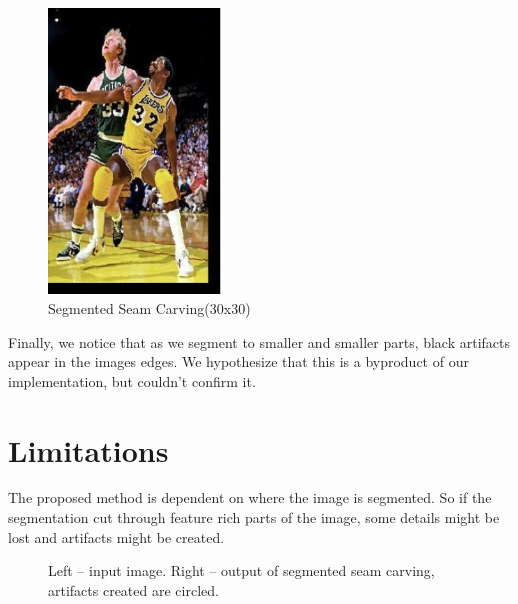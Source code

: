 \documentclass[conference]{acmsiggraph}
\begin{document}
\begin{figure}[ht]
  \centering
  \includegraphics[width=1.8in]{images/bird_32by32}
  \caption{ Segmented Seam Carving(30x30)
  }
  \label{fig:bird3232}
\end{figure}


Finally, we notice that as we segment to smaller and smaller parts, black artifacts appear in the images edges. We hypothesize that this is a byproduct of our implementation, but couldn't confirm it.


\section{Limitations}

The proposed method is dependent on where the image is segmented. So if the segmentation cut through feature rich parts of the image, some details might be lost and artifacts might be created. 

\begin{figure}[ht]       
    \caption{Left -- input image. Right -- output of segmented seam carving, artifacts created are circled.}
    \label{fig:Beach_in_and_out}
    
\end{figure}
\end{document}
